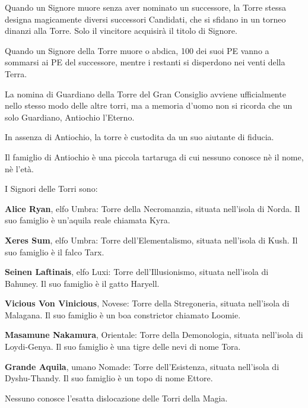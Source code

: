 Quando un Signore muore senza aver nominato un successore, la Torre
stessa designa magicamente diversi successori Candidati, che si
sfidano in un torneo dinanzi alla Torre. Solo il vincitore
acquisir\`a il titolo di Signore.

Quando un Signore della Torre muore o abdica, 100 dei suoi PE vanno a
sommarsi ai PE del successore, mentre i restanti si disperdono nei
venti della Terra.

La nomina di Guardiano della Torre del Gran Consiglio avviene
ufficialmente nello stesso modo delle altre torri, ma a memoria d'uomo
non si ricorda che un solo Guardiano, Antiochio l'Eterno.

In assenza di Antiochio, la torre \`e custodita da un suo aiutante di
fiducia.  

Il famiglio di Antiochio \`e una piccola tartaruga di cui nessuno
conosce n\`e il nome, n\`e l'et\`a.

I Signori delle Torri sono:

\begin{description}
\item{\bf Alice Ryan}, elfo Umbra: Torre della Necromanzia, situata
  nell'isola di Norda. Il suo famiglio \`e un'aquila reale chiamata
  Kyra.
  
\item{\bf Xeres Sum}, elfo Umbra: Torre dell'Elementalismo, situata
  nell'isola di Kush. Il suo famiglio \`e il falco Tarx.
  
\item{\bf Seinen Laftinais}, elfo Luxi: Torre dell'Illusionismo,
  situata nell'isola di Bahuney. Il suo famiglio \`e il gatto
  Haryell.
  
\item{\bf Vicious Von Vinicious}, Novese: Torre della
  Stregoneria, situata nell'isola di Malagana. Il suo famiglio \`e
  un boa constrictor chiamato Loomie.
  
\item{\bf Masamune Nakamura}, Orientale: Torre della
  Demonologia, situata nell'isola di Loydi-Genya. Il suo famiglio
  \`e una tigre delle nevi di nome Tora.
  
\item{\bf Grande Aquila}, umano Nomade: Torre dell'Esistenza, situata
  nell'isola di Dyshu-Thandy. Il suo famiglio \`e un topo di nome
  Ettore.
\end{description}

Nessuno conosce l'esatta dislocazione delle Torri della Magia. 

